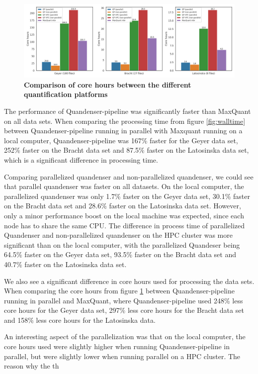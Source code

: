 \documentclass[11pt]{article}
\begin{document}
\begin{figure}[H]
  \includegraphics[width=\linewidth]{data/cores.png}
  \caption{\textbf{Comparison of core hours between the different quantification platforms}}
  \label{fig:corehours}
\end{figure}

The performance of Quandenser-pipeline was significantly faster than MaxQuant on all data sets. When comparing the processing time from figure \ref{fig:walltime} between Quandenser-pipeline running in parallel with Maxquant running on a local computer, Quandenser-pipeline was 167\% faster for the Geyer data set, 252\% faster on the Bracht data set and 87.5\% faster on the Latosinska data set, which is a significant difference in processing time.

Comparing parallelized quandenser and non-parallelized quandenser, we could see that parallel quandenser was faster on all datasets. On the local computer, the parallelized quandenser was only 1.7\% faster on the Geyer data set, 30.1\% faster on the Bracht data set and 28.6\% faster on the Latosinska data set. However, only a minor performance boost on the local machine was expected, since each node has to share the same CPU. The difference in process time of parallelized Quandenser and non-parallelized quandenser on the HPC cluster was more significant than on the local computer, with the parallelized Quandeser being 64.5\% faster on the Geyer data set, 93.5\% faster on the Bracht data set and 40.7\% faster on the Latosinska data set.

We also see a significant difference in core hours used for processing the data sets. When comparing the core hours from figure \ref{fig:corehours} between Quandenser-pipeline running in parallel and MaxQuant, where Quandenser-pipeline used 248\% less core hours for the Geyer data set, 297\% less core hours for the Bracht data set and 158\% less core hours for the Latosinska data.

An interesting aspect of the parallelization was that on the local computer, the core hours used were slightly higher when running Quandenser-pipeline in parallel, but were slightly lower when running parallel on a HPC cluster. The reason why the th
\end{document}
